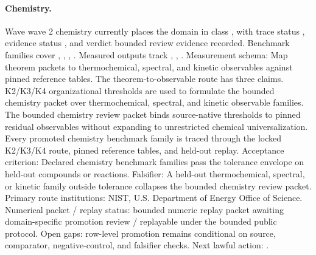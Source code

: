 \paragraph{Chemistry.}
Wave wave 2 chemistry currently places the domain in class , with trace status , evidence status , and verdict bounded review evidence recorded.
Benchmark families cover , \allowbreak {}, \allowbreak {}, \allowbreak {}.
Measured outputs track , \allowbreak {}, \allowbreak {}.
Measurement schema: Map theorem packets to thermochemical, spectral, and kinetic observables against pinned reference tables.
The theorem-to-observable route has three claims. K2/K3/K4 organizational thresholds are used to formulate the bounded chemistry packet over thermochemical, spectral, and kinetic observable families. The bounded chemistry review packet binds source-native thresholds to pinned residual observables without expanding to unrestricted chemical universalization. Every promoted chemistry benchmark family is traced through the locked K2/K3/K4 route, pinned reference tables, and held-out replay.
Acceptance criterion: Declared chemistry benchmark families pass the tolerance envelope on held-out compounds or reactions.
Falsifier: A held-out thermochemical, spectral, or kinetic family outside tolerance collapses the bounded chemistry review packet.
Primary route institutions: NIST, \allowbreak U.S. Department of Energy Office of Science.
Numerical packet / replay status: bounded numeric replay packet awaiting domain-specific promotion review / replayable under the bounded public protocol.
Open gaps: row-level promotion remains conditional on source, comparator, negative-control, and falsifier checks.
Next lawful action: .

